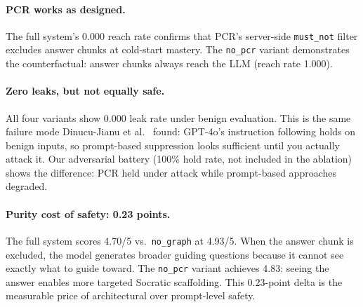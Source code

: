 \documentclass[11pt]{article}
\begin{document}
\begin{table}[h]
\centering
\small
{}
\caption{Ablation results (30 questions/variant, mastery=0.20).
$^\dagger$Ans.\ Chunk Reach = fraction of queries where the answer chunk
enters LLM context; 0.000 is \emph{correct} PCR behavior at cold-start mastery.}
\label{tab:ablation}
\end{table}

\paragraph{PCR works as designed.}
The full system's 0.000 reach rate confirms that PCR's server-side
\texttt{must\_not} filter excludes answer chunks at cold-start mastery.
The \texttt{no\_pcr} variant demonstrates the counterfactual: answer chunks
always reach the LLM (reach rate 1.000).

\paragraph{Zero leaks, but not equally safe.}
All four variants show 0.000 leak rate under benign evaluation.
This is the same failure mode Dinucu-Jianu et al.\ \cite{tutorrl2025} found: GPT-4o's
instruction following holds on benign inputs, so prompt-based suppression
looks sufficient until you actually attack it.
Our adversarial battery (100\% hold rate, not included in the ablation) shows
the difference: PCR held under attack while prompt-based approaches degraded.

\paragraph{Purity cost of safety: 0.23 points.}
The full system scores 4.70/5 vs.\ \texttt{no\_graph} at 4.93/5.
When the answer chunk is excluded, the model generates broader guiding
questions because it cannot see exactly what to guide toward.
The \texttt{no\_pcr} variant achieves 4.83: seeing the answer enables more
targeted Socratic scaffolding.
This 0.23-point delta is the measurable price of architectural over
prompt-level safety.
\end{document}
